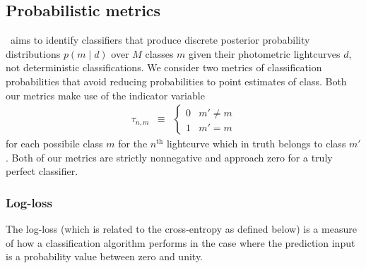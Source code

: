 

\subsection{Probabilistic metrics}
\label{sec:probabilistic}

\plasticc\ aims to identify classifiers that produce discrete posterior probability distributions $p(m \mid d)$ over $M$ classes $m$ given their photometric lightcurves $d$, not deterministic classifications.
We consider two metrics of classification probabilities that avoid reducing probabilities to point estimates of class.
Both our metrics make use of the indicator variable
\begin{eqnarray}
  \label{eq:indicator}
  \tau_{n, m} &\equiv& \begin{cases}
  0 & m' \neq m\\
  1 & m' = m
  \end{cases}
\end{eqnarray}
for each possibile class $m$ for the $n^{\mathrm{th}}$ lightcurve which in truth belongs to class $m'$.
Both of our metrics are strictly nonnegative and approach zero for a truly perfect classifier.

\subsubsection{Log-loss}
\label{sec:logloss}

The log-loss (which is related to the cross-entropy as defined below) is a measure of how a classification algorithm performs in the case where the prediction input is a probability value between zero and unity.


